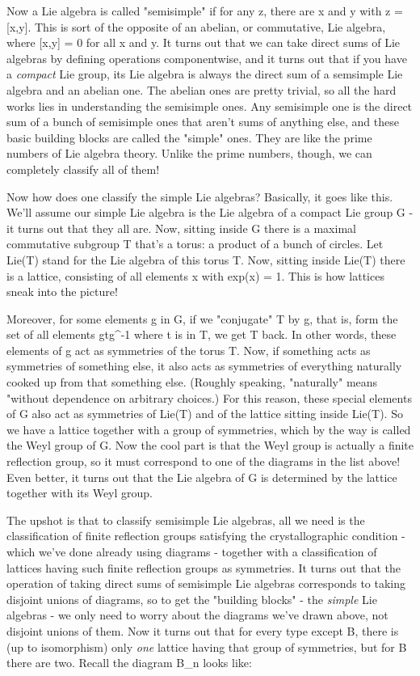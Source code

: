 Now a Lie algebra is called "semisimple" if for any z, there
are x and y with z = [x,y].  This is sort of the opposite of an
abelian, or commutative, Lie algebra, where [x,y] = 0 for all x and y.
It turns out that we can take direct sums of Lie algebras by defining
operations componentwise, and it turns out that if you have a
\emph{compact} Lie group, its Lie algebra is always the direct sum
of a semsimple Lie algebra and an abelian one.  The abelian ones are
pretty trivial, so all the hard works lies in understanding the
semisimple ones.  Any semisimple one is the direct sum of a bunch of
semisimple ones that aren't sums of anything else, and these basic
building blocks are called the "simple" ones.  They are like
the prime numbers of Lie algebra theory.  Unlike the prime numbers,
though, we can completely classify all of them!

Now how does one classify the simple Lie algebras?  Basically, it goes
like this.  We'll assume our simple Lie algebra is the Lie algebra of a
compact Lie group G - it turns out that they all are.  Now, sitting
inside G there is a maximal commutative subgroup T that's a torus: a
product of a bunch of circles.  Let Lie(T) stand for the Lie algebra of
this torus T.  Now, sitting inside Lie(T) there is a lattice, consisting
of all elements x with exp(x) = 1.  This is how lattices sneak into the
picture!

Moreover, for some elements g in G, if we "conjugate" T by
g, that is, form the set of all elements gtg^{-1} where t is
in T, we get T back.  In other words, these elements of g act as
symmetries of the torus T.  Now, if something acts as symmetries of
something else, it also acts as symmetries of everything naturally
cooked up from that something else.  (Roughly speaking,
"naturally" means "without dependence on arbitrary
choices.)  For this reason, these special elements of G also act as
symmetries of Lie(T) and of the lattice sitting inside Lie(T).  So we
have a lattice together with a group of symmetries, which by the way
is called the Weyl group of G.  Now the cool part is that the Weyl
group is actually a finite reflection group, so it must correspond to
one of the diagrams in the list above!  Even better, it turns out that
the Lie algebra of G is determined by the lattice together with its
Weyl group.

The upshot is that to classify semisimple Lie algebras, all we need is
the classification of finite reflection groups satisfying the
crystallographic condition - which we've done already using diagrams
- together with a classification of lattices having such finite
reflection groups as symmetries.  It turns out that the operation of
taking direct sums of semisimple Lie algebras corresponds to taking
disjoint unions of diagrams, so to get the "building blocks" - the
\emph{simple} Lie algebras - we only need to worry about the diagrams we've
drawn above, not disjoint unions of them.  Now it turns out that for
every type except B, there is (up to isomorphism) only \emph{one} lattice
having that group of symmetries, but for B there are two.  Recall the
diagram B_{n} looks like:

